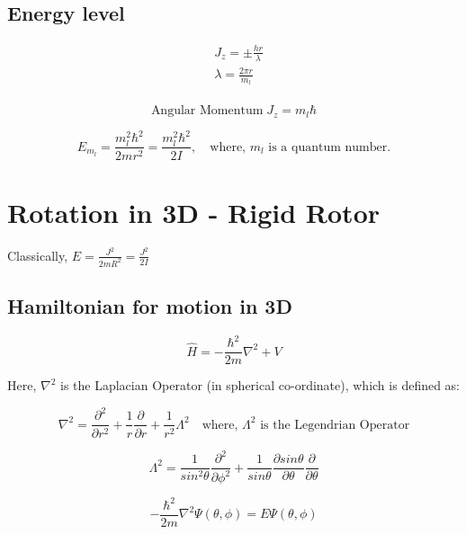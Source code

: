\documentclass[12pt]{article}
\theoremstyle{definition}
\begin{document}
\subsection{Energy level}

\begin{align*}
	&J_z = \pm \frac{hr}{\lambda}\\
	&\lambda = \frac{2\pi r}{m_l}\\
\end{align*}

\begin{equation*}
	\textrm{Angular Momentum}\; J_z = m_l \hbar 
\end{equation*}

\begin{equation*}
	E_{m_l} = \frac{m_l^2\hbar^2}{2mr^2} = \frac{m_l^2\hbar^2}{2I}, \quad \textrm{where, $m_l$ is a quantum number.}  
\end{equation*}

\section{Rotation in 3D - Rigid Rotor}
Classically, $E = \frac{J^2}{2mR^2} = \frac{J^2}{2I}$  

\subsection{Hamiltonian for motion in 3D}
\begin{equation*}
	\hat{H} = - \frac{\hbar^2}{2m} \nabla^2 + V
\end{equation*}

Here, $\nabla^2$ is the Laplacian Operator (in spherical co-ordinate), which is defined as:

\begin{equation*}
	\nabla^2 = \frac{\partial^2}{\partial r^2} + \frac{1}{r} \frac{\partial}{\partial r} + \frac{1}{r^2} \Lambda^2 \quad \textrm{where, $\Lambda^2$ is the Legendrian Operator}
\end{equation*}

\begin{equation*}
	\Lambda^2 = \frac{1}{sin^2\theta} \frac{\partial^2}{\partial\phi^2} + \frac{1}{sin\theta} \frac{\partial sin\theta}{\partial \theta} \frac{\partial}{\partial\theta}  
\end{equation*}

\begin{equation*}
	- \frac{\hbar^2}{2m} \nabla^2 \Psi(\theta, \phi) = E \Psi(\theta, \phi)
\end{equation*}
\end{document}
